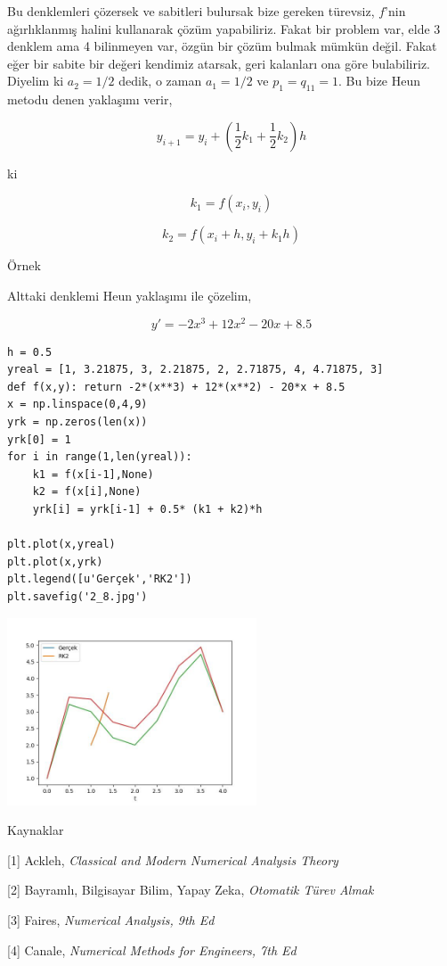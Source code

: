 \documentclass[12pt,fleqn]{article}\usepackage{../../common}
\begin{document}
Bu denklemleri çözersek ve sabitleri bulursak bize gereken türevsiz, $f$'nin
ağırlıklanmış halini kullanarak çözüm yapabiliriz. Fakat bir problem var,
elde 3 denklem ama 4 bilinmeyen var, özgün bir çözüm bulmak mümkün değil.
Fakat eğer bir sabite bir değeri kendimiz atarsak, geri kalanları ona
göre bulabiliriz. Diyelim ki $a_2 = 1/2$ dedik, o zaman $a_1 = 1/2$ ve
$p_1 = q_{11} = 1$. Bu bize Heun metodu denen yaklaşımı verir,

$$
y_{i+1} = y_i + \left( \frac{1}{2} k_1 + \frac{1}{2} k_2 \right) h
$$

ki

$$
k_1 = f(x_i,y_i)
$$

$$
k_2 = f(x_i + h, y_i + k_1 h)
$$

Örnek

Alttaki denklemi Heun yaklaşımı ile çözelim,

$$
y' = -2x^3 + 12x^2 - 20x + 8.5
$$

\begin{verbatim}
h = 0.5
yreal = [1, 3.21875, 3, 2.21875, 2, 2.71875, 4, 4.71875, 3]
def f(x,y): return -2*(x**3) + 12*(x**2) - 20*x + 8.5
x = np.linspace(0,4,9)
yrk = np.zeros(len(x))
yrk[0] = 1
for i in range(1,len(yreal)):
    k1 = f(x[i-1],None)
    k2 = f(x[i],None)
    yrk[i] = yrk[i-1] + 0.5* (k1 + k2)*h
    
plt.plot(x,yreal)
plt.plot(x,yrk)
plt.legend([u'Gerçek','RK2'])
plt.savefig('2_8.jpg')
\end{verbatim}

\includegraphics[width=20em]{2_8.jpg}

Kaynaklar

[1] Ackleh, {\em Classical and Modern Numerical Analysis Theory}

[2] Bayramlı, Bilgisayar Bilim, Yapay Zeka, {\em Otomatik Türev Almak}

[3] Faires, {\em Numerical Analysis, 9th Ed}

[4] Canale, {\em Numerical Methods for Engineers, 7th Ed}
\end{document}
